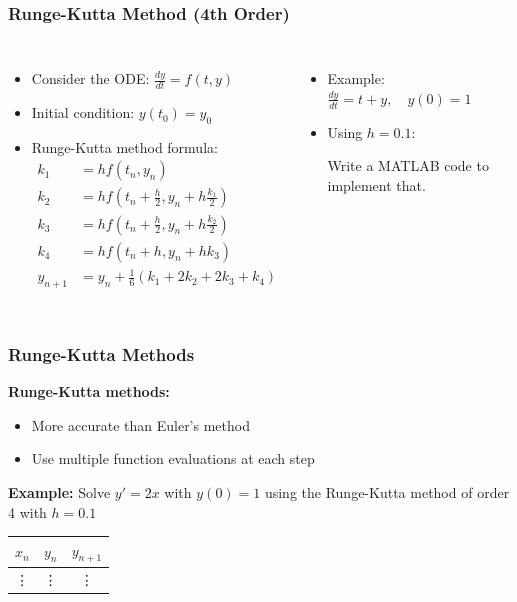 \documentclass[aspectratio=169,xcolor=dvipsnames,svgnames,x11names,fleqn]{beamer}
\begin{document}
\begin{frame}
\frametitle{Runge-Kutta Method (4th Order)}
\begin{columns}
    \begin{itemize}
          \item Consider the ODE: $ \frac{dy}{dt} = f(t, y) $
    \item Initial condition: $ y(t_0) = y_0 $
    \item Runge-Kutta method formula:
    $$
    \begin{aligned}
    k_1 &= h f(t_n, y_n) \\
    k_2 &= h f\left(t_n + \frac{h}{2}, y_n + h \frac{k_1}{2}\right) \\
    k_3 &= h f\left(t_n + \frac{h}{2}, y_n + h \frac{k_2}{2}\right) \\
    k_4 &= h f(t_n + h, y_n + h k_3) \\
    y_{n+1} &= y_n + \frac{1}{6}(k_1 + 2k_2 + 2k_3 + k_4)
    \end{aligned}
    $$
    \end{itemize}

\begin{itemize}
  
    \item Example: $ \frac{dy}{dt} = t + y, \quad y(0) = 1 $
    \item Using $ h = 0.1 $:
   
    Write a MATLAB code to implement that.
\end{itemize}
\end{columns}
\end{frame}



\begin{frame}
  \frametitle{Runge-Kutta Methods}
  \textbf{Runge-Kutta methods:}
  \begin{itemize}
    \item More accurate than Euler's method
    \item Use multiple function evaluations at each step
  \end{itemize}
  \textbf{Example:} Solve $y' = 2x$ with $y(0) = 1$ using the Runge-Kutta method of order 4 with $h = 0.1$
  \begin{table}
    \begin{tabular}{c|c|c}
      $x_n$ & $y_n$ & $y_{n+1}$ \\
      \hline
      \vdots & \vdots & \vdots
    \end{tabular}
  \end{table}
\end{frame}
\end{document}
